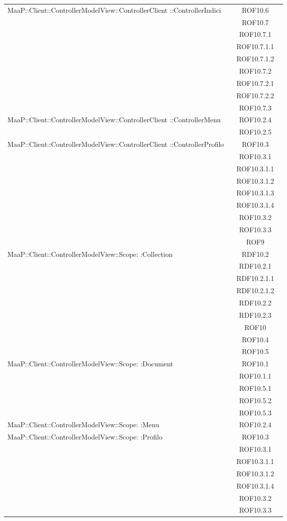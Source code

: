 \begin{center}
\begin{longtable}{|p{0.8\linewidth}|c|}
\midrule
MaaP::Client::ControllerModelView::ControllerClient ::ControllerIndici
& ROF10.6\\
& ROF10.7\\
& ROF10.7.1\\
& ROF10.7.1.1\\
& ROF10.7.1.2\\
& ROF10.7.2\\
& ROF10.7.2.1\\
& ROF10.7.2.2\\
& ROF10.7.3\\

\midrule
MaaP::Client::ControllerModelView::ControllerClient ::ControllerMenu
& ROF10.2.4\\
& ROF10.2.5\\

\midrule
MaaP::Client::ControllerModelView::ControllerClient ::ControllerProfilo
& ROF10.3\\
& ROF10.3.1\\
& ROF10.3.1.1\\
& ROF10.3.1.2\\
& ROF10.3.1.3\\
& ROF10.3.1.4\\
& ROF10.3.2\\
& ROF10.3.3\\
& ROF9\\

\midrule
MaaP::Client::ControllerModelView::Scope: :Collection
& RDF10.2\\
& RDF10.2.1\\
& RDF10.2.1.1\\
& RDF10.2.1.2\\
& RDF10.2.2\\
& RDF10.2.3\\
& ROF10\\
& ROF10.4\\
& ROF10.5\\

\midrule
MaaP::Client::ControllerModelView::Scope: :Document
& ROF10.1\\
& ROF10.1.1\\
& ROF10.5.1\\
& ROF10.5.2\\
& ROF10.5.3\\

\midrule
MaaP::Client::ControllerModelView::Scope: :Menu
& ROF10.2.4\\

\midrule
MaaP::Client::ControllerModelView::Scope: :Profilo
& ROF10.3\\
& ROF10.3.1\\
& ROF10.3.1.1\\
& ROF10.3.1.2\\
& ROF10.3.1.4\\
& ROF10.3.2\\
& ROF10.3.3\\


\end{longtable}
\end{center}

